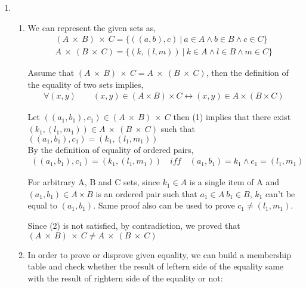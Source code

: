 \documentclass[11pt]{article}
\begin{document}
\begin{enumerate}
\begin{enumerate}
\end{enumerate}

\item 
\renewcommand{\theenumi}{\roman{enumi}}
\begin{enumerate}
	\item
	We can represent the given sets as,
	\begin{equation}
	\begin{split}
	(A \ \times \ B)\ \times \ C = \{ ((a,b),c) \ | \ a \in A \land b \in B \land c \in C\} \\
	A \ \times \ (B\ \times \ C) = \{ (k,(l,m)) \ | \ k \in A \land l \in B \land m \in C\}
	\end{split}
	\end{equation}
	
	Assume that $(A \ \times \ B)\ \times \ C =  A \ \times \ (B\ \times \ C)$, then the definition of the equality of two sets implies,
	\begin{equation}
	\begin{split}\forall (x,y) \qquad
	(x,y) \in (A  \times  B) \times  C \leftrightarrow (x,y) \in A  \times  (B \times C) 
	\end{split}
	\end{equation}
	
	Let $((a_{1},b_{1}),c_{1}) \in (A \ \times \ B)\ \times \ C$ then (1) implies that there exist $(k_{1},(l_{1},m_{1}))\in A \ \times \ (B\ \times \ C)$ such that $((a_{1},b_{1}),c_{1}) = (k_{1},(l_{1},m_{1}))$\\
	
	By the definition of equality of ordered pairs, 
	\begin{equation*}
	\begin{split}
	((a_{1},b_{1}),c_{1}) = (k_{1},(l_{1},m_{1})) \quad iff \quad (a_{1},b_{1}) = k_{1} \land c_{1} = (l_{1},m_{1})
	\end{split}
	\end{equation*}
	
	For arbitrary A, B and C sets, since $k_{1} \in A$ is a single item of A and $(a_{1},b_{1}) \in A \times B$ is an ordered pair such that $a_{1}\in A \ b_{1} \in B$, $k_{1}$ can't be equal to $(a_{1},b_{1})$. Same proof also can be used to prove $c_{1} \neq (l_{1},m_{1})$.
	
	Since (2) is not satisfied, by contradiction, we proved that $(A \ \times \ B)\ \times \ C \neq  A \ \times \ (B\ \times \ C)$ \\
	
	\item
	In order to prove or disprove given equality, we can build a membership table and check whether the result of leftern side of the equality same with the result of rightern side of the equality or not:
	

\end{enumerate}
\end{enumerate}
\end{document}
